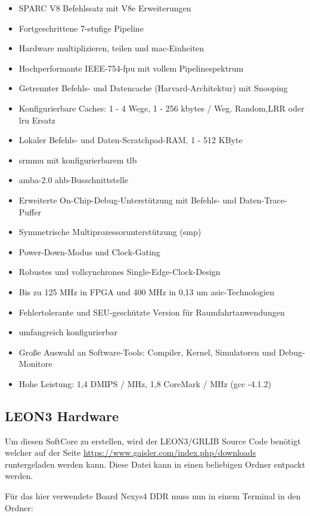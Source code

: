 \begin{itemize}
  \item SPARC V8 Befehlssatz mit V8e Erweiterungen
\item Fortgeschrittene 7-stufige Pipeline
\item Hardware multiplizieren, teilen und \ac{mac}-Einheiten
\item Hochperformante IEEE-754-\ac{fpu} mit vollem Pipelinespektrum
\item Getrennter Befehls- und Datencache (Harvard-Architektur) mit Snooping
\item Konfigurierbare Caches: 1 - 4 Wege, 1 - 256 kbytes / Weg. Random,LRR oder \ac{lru} Ersatz
\item Lokaler Befehls- und Daten-Scratchpad-RAM, 1 - 512 KByte
\item \ac{srmmu} mit konfigurierbarem \ac{tlb}
\item \ac{amba}-2.0 \ac{ahb}-Busschnittstelle
\item Erweiterte On-Chip-Debug-Unterstützung mit Befehls- und Daten-Trace-Puffer
\item Symmetrische Multiprozessorunterstützung (\ac{smp})
\item Power-Down-Modus und Clock-Gating
\item Robustes und vollsynchrones Single-Edge-Clock-Design
\item Bis zu 125 MHz in FPGA und 400 MHz in 0,13 um \ac{asic}-Technologien
\item Fehlertolerante und SEU-geschützte Version für Raumfahrtanwendungen
\item umfangreich konfigurierbar
\item Große Auswahl an Software-Tools: Compiler, Kernel, Simulatoren und Debug-Monitore
\item Hohe Leistung: 1,4 DMIPS / MHz, 1,8 CoreMark / MHz (gcc -4.1.2)
\end{itemize}

\subsection{LEON3 Hardware}\label{kap:leon3hardware}

Um diesen SoftCore zu erstellen, wird der LEON3/GRLIB Source Code benötigt welcher auf der Seite
\url{https://www.gaisler.com/index.php/downloads} runtergeladen werden kann.
Diese Datei kann in einen beliebigen Ordner entpackt werden.

Für das hier verwendete Board Nexys4 DDR muss nun in einem Terminal in den Ordner:\\

